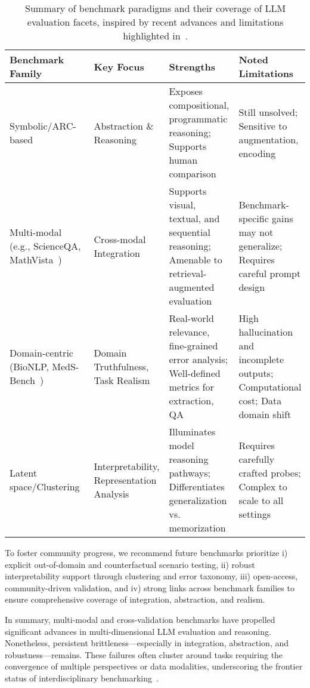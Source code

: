 \documentclass[sigconf]{acmart}
\begin{document}
\begin{table*}[htbp]
\centering
\caption{Summary of benchmark paradigms and their coverage of LLM evaluation facets, inspired by recent advances and limitations highlighted in~\cite{ref79,ref85,ref92,ref94,ref95}.}
\label{tab:benchmark-paradigms}
\begin{adjustbox}{max width=\textwidth}
\begin{tabular}{@{}llll@{}}
\toprule
Benchmark Family & Key Focus & Strengths & Noted Limitations \\
\midrule
Symbolic/ARC-based~\cite{ref92} & Abstraction \& Reasoning & Exposes compositional, programmatic reasoning; Supports human comparison & Still unsolved; Sensitive to augmentation, encoding \\
Multi-modal (e.g., ScienceQA, MathVista~\cite{ref85}) & Cross-modal Integration & Supports visual, textual, and sequential reasoning; Amenable to retrieval-augmented evaluation & Benchmark-specific gains may not generalize; Requires careful prompt design \\
Domain-centric (BioNLP, MedS-Bench~\cite{ref94,ref95}) & Domain Truthfulness, Task Realism & Real-world relevance, fine-grained error analysis; Well-defined metrics for extraction, QA & High hallucination and incomplete outputs; Computational cost; Data domain shift\\
Latent space/Clustering~\cite{ref79,ref85} & Interpretability, Representation Analysis & Illuminates model reasoning pathways; Differentiates generalization vs. memorization & Requires carefully crafted probes; Complex to scale to all settings \\
\bottomrule
\end{tabular}
\end{adjustbox}
\end{table*}

To foster community progress, we recommend future benchmarks prioritize i) explicit out-of-domain and counterfactual scenario testing, ii) robust interpretability support through clustering and error taxonomy, iii) open-access, community-driven validation, and iv) strong links across benchmark families to ensure comprehensive coverage of integration, abstraction, and realism.

In summary, multi-modal and cross-validation benchmarks have propelled significant advances in multi-dimensional LLM evaluation and reasoning. Nonetheless, persistent brittleness---especially in integration, abstraction, and robustness---remains. These failures often cluster around tasks requiring the convergence of multiple perspectives or data modalities, underscoring the frontier status of interdisciplinary benchmarking~\cite{ref79,ref85,ref92,ref94,ref95}.
\end{document}
